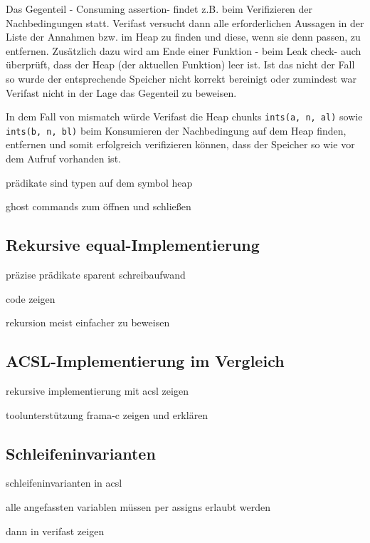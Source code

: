 Das Gegenteil - \glqq Consuming assertion\grqq - findet z.B. beim Verifizieren der Nachbedingungen statt.
Verifast versucht dann alle erforderlichen Aussagen in der Liste der Annahmen bzw. im Heap zu finden
und diese, wenn sie denn passen, zu entfernen. Zusätzlich dazu wird am Ende einer Funktion - beim 
\glqq Leak check\grqq - auch überprüft, dass der Heap (der aktuellen Funktion) leer ist. Ist das nicht 
der Fall so wurde der entsprechende Speicher nicht korrekt bereinigt oder zumindest war Verifast nicht 
in der Lage das Gegenteil zu beweisen.

In dem Fall von mismatch würde Verifast die Heap chunks \lstinline{ints(a, n, al)} sowie
\lstinline{ints(b, n, bl)} beim Konsumieren der Nachbedingung auf dem Heap finden, entfernen und
somit erfolgreich verifizieren können, dass der Speicher so wie vor dem Aufruf vorhanden ist.



prädikate sind typen auf dem symbol heap

ghost commands zum öffnen und schließen

\subsection{Rekursive equal-Implementierung}



präzise prädikate sparent schreibaufwand

code zeigen

rekursion meist einfacher zu beweisen

\subsection{ACSL-Implementierung im Vergleich}

rekursive implementierung mit acsl zeigen

toolunterstützung frama-c zeigen und erklären

\subsection{Schleifeninvarianten}

schleifeninvarianten in acsl

alle angefassten variablen müssen per assigns erlaubt werden

dann in verifast zeigen

